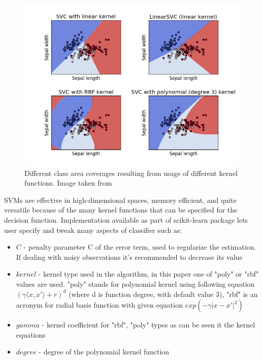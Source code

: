 \begin{figure}[htp]
	\centering
	\includegraphics[width=1.0\textwidth]{Figures/svm_kernel_functions.png}
	\caption{Different class area coverages resulting from usage of different kernel functions. Image taken from \cite{Scikit-Learn_Website}}
	\label{fig:svm_kernel_functions}\vspace{-3pt}
\end{figure}

SVMs are effective in high-dimensional spaces, memory efficient, and quite versatile because of the many kernel functions that can be specified for the decision function. Implementation available as part of scikit-learn package lets user specify and tweak many aspects of classifier such as:

\begin{itemize}
	\item $C$ - penalty parameter C of the error term, used to regularize the estimation. If dealing with noisy observations it's recommended to decrease its value
	\item $kernel$ - kernel type used in the algorithm, in this paper one of "poly" or "rbf" values are used. "poly" stands for polynomial kernel using following equation $(\gamma \langle x, x' \rangle + r)^{d}$ (where d is function degree, with default value 3), "rbf" is an acronym for radial basis function with given equation $exp(-\gamma|x - x'|^{2})$
	\item $gamma$ - kernel coefficient for "rbf", "poly" types as can be seen it the kernel equations
	\item $degree$ - degree of the polynomial kernel function
\end{itemize}

